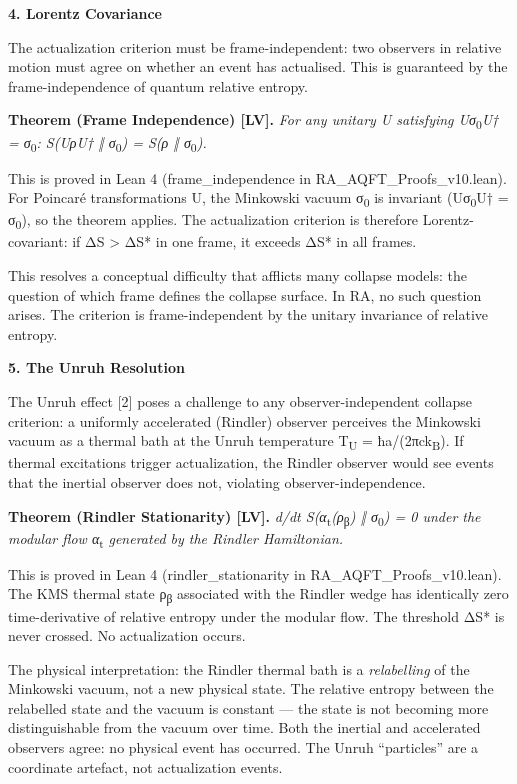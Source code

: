 \documentclass[12pt,a4paper]{article}
\begin{document}
\textbf{4. Lorentz Covariance}

The actualization criterion must be frame-independent: two observers in
relative motion must agree on whether an event has actualised. This is
guaranteed by the frame-independence of quantum relative entropy.

\textbf{Theorem (Frame Independence) {[}LV{]}.} \emph{For any unitary U
satisfying Uσ}\textsubscript{0}\emph{U† = σ}\textsubscript{0}\emph{:
S(UρU† ‖ σ}\textsubscript{0}\emph{) = S(ρ ‖ σ}\textsubscript{0}\emph{).}

This is proved in Lean 4 (frame\_independence in
RA\_AQFT\_Proofs\_v10.lean). For Poincaré transformations U, the
Minkowski vacuum σ\textsubscript{0} is invariant (Uσ\textsubscript{0}U†
= σ\textsubscript{0}), so the theorem applies. The actualization
criterion is therefore Lorentz-covariant: if ΔS \textgreater{} ΔS* in
one frame, it exceeds ΔS* in all frames.

This resolves a conceptual difficulty that afflicts many collapse
models: the question of which frame defines the collapse surface. In RA,
no such question arises. The criterion is frame-independent by the
unitary invariance of relative entropy.

\textbf{5. The Unruh Resolution}

The Unruh effect {[}2{]} poses a challenge to any observer-independent
collapse criterion: a uniformly accelerated (Rindler) observer perceives
the Minkowski vacuum as a thermal bath at the Unruh temperature
T\textsubscript{U} = ħa/(2πck\textsubscript{B}). If thermal excitations
trigger actualization, the Rindler observer would see events that the
inertial observer does not, violating observer-independence.

\textbf{Theorem (Rindler Stationarity) {[}LV{]}.} \emph{d/dt
S(α}\textsubscript{t}\emph{(ρ}\textsubscript{β}\emph{) ‖
σ}\textsubscript{0}\emph{) = 0 under the modular flow
α}\textsubscript{t} \emph{generated by the Rindler Hamiltonian.}

This is proved in Lean 4 (rindler\_stationarity in
RA\_AQFT\_Proofs\_v10.lean). The KMS thermal state ρ\textsubscript{β}
associated with the Rindler wedge has identically zero time-derivative
of relative entropy under the modular flow. The threshold ΔS* is never
crossed. No actualization occurs.

The physical interpretation: the Rindler thermal bath is a
\emph{relabelling} of the Minkowski vacuum, not a new physical state.
The relative entropy between the relabelled state and the vacuum is
constant --- the state is not becoming more distinguishable from the
vacuum over time. Both the inertial and accelerated observers agree: no
physical event has occurred. The Unruh ``particles'' are a coordinate
artefact, not actualization events.
\end{document}
